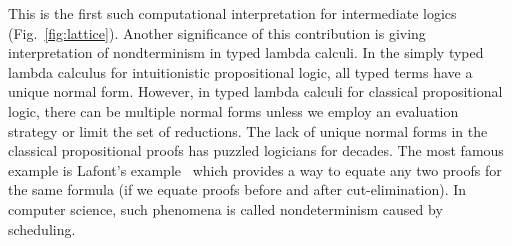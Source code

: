 This is the first such computational
interpretation for intermediate logics (Fig.~\ref{fig:lattice}).
Another significance of this contribution
is giving interpretation of nondterminism in typed
lambda calculi.  In the simply typed lambda calculus for intuitionistic
propositional logic, all typed terms have a unique normal form.
However, in typed lambda calculi for classical propositional logic,
there can be multiple normal forms unless we employ an evaluation
strategy or limit the set of reductions.
The lack of unique normal forms in the classical propositional proofs
has puzzled logicians for decades.
The most famous example is Lafont's
example~\citep[B.1.]{girard1989proofs} which provides a way to equate
any two proofs for the same formula (if we equate proofs before and
after cut-elimination).
In computer science, such phenomena is called nondeterminism caused by scheduling.
